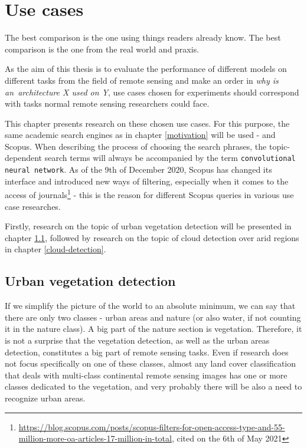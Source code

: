 \chapter{Use cases}
\label{use-cases}

The best comparison is the one using things readers already know. The best comparison is the one from the real world and praxis.

As the aim of this thesis is to evaluate the performance of different  models on different tasks from the field of remote sensing and make an order in \textit{why is an~architecture X used on Y}, use cases chosen for experiments should correspond with tasks normal remote sensing researchers could face.

This chapter presents research on these chosen use cases. For this purpose, the same academic search engines as in chapter \ref{motivation} will be used -  and Scopus. When describing the process of choosing the search phrases, the topic-dependent search terms will always be accompanied by the term \verb|convolutional neural network|. As of the 9th of December 2020, Scopus has changed its interface and introduced new ways of filtering, especially when it comes to the access of journals\footnote{\url{https://blog.scopus.com/posts/scopus-filters-for-open-access-type-and-55-million-more-oa-articles-17-million-in-total}, cited on the 6th of May 2021} - this is the reason for different Scopus queries in various use case researches.

Firstly, research on the topic of urban vegetation detection will be presented in chapter \ref{urban-green}, followed by research on the topic of cloud detection over arid regions in chapter \ref{cloud-detection}.

\section{Urban vegetation detection}
\label{urban-green}

If we simplify the picture of the world to an absolute minimum, we can say that there are only two classes - urban areas and nature (or also water, if not counting it in the nature class). A big part of the nature section is vegetation. Therefore, it is not a surprise that the vegetation detection, as well as the urban areas detection, constitutes a big part of remote sensing tasks. Even if research does not focus specifically on one of these classes, almost any land cover classification that deals with multi-class continental remote sensing images has one or more classes dedicated to the vegetation, and very probably there will be also a need to recognize urban areas.

